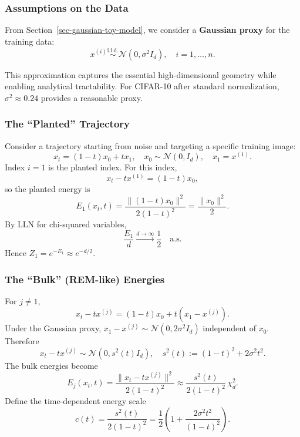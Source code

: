 \documentclass[11pt]{article}
\begin{document}
\subsubsection{Assumptions on the Data}
From Section~\ref{sec-gaussian-toy-model}, we consider a \textbf{Gaussian proxy} for the training data:
\begin{equation}
x^{(i)} \stackrel{\text{i.i.d.}}{\sim} \mathcal{N}(0, \sigma^2 I_d), \quad i = 1, \dots, n.
\end{equation}

This approximation captures the essential high-dimensional geometry while enabling analytical tractability. For CIFAR-10 after standard normalization, $\sigma^2 \approx 0.24$ provides a reasonable proxy.

\subsubsection{The ``Planted'' Trajectory}
Consider a trajectory starting from noise and targeting a specific training image:
\begin{equation}
x_t = (1-t)x_0 + tx_1, \quad x_0 \sim \mathcal{N}(0, I_d), \quad x_1 = x^{(1)}.
\end{equation}
Index $i=1$ is the planted index. For this index,
\begin{equation}
x_t - t x^{(1)} = (1-t) x_0,
\end{equation}
so the planted energy is
\begin{equation}
E_1(x_t,t) = \frac{\|(1-t)x_0\|^2}{2(1-t)^2} = \frac{\|x_0\|^2}{2}.
\end{equation}
By LLN for chi-squared variables,
\begin{equation}
\frac{E_1}{d} \xrightarrow{d\to\infty} \frac{1}{2} \quad \text{a.s.}
\end{equation}
Hence $Z_1=e^{-E_1}\approx e^{-d/2}$.

\subsubsection{The ``Bulk'' (REM-like) Energies}
For $j\neq 1$,
\begin{equation}
x_t - t x^{(j)} = (1-t)x_0 + t(x_1 - x^{(j)}).
\end{equation}
Under the Gaussian proxy, $x_1 - x^{(j)} \sim \mathcal{N}(0, 2\sigma^2 I_d)$ independent of $x_0$. Therefore
\begin{equation}
x_t - t x^{(j)} \sim \mathcal{N}(0, s^2(t) I_d), \quad s^2(t) := (1-t)^2 + 2\sigma^2 t^2.
\end{equation}
The bulk energies become
\begin{equation}
E_j(x_t,t)=\frac{\|x_t - t x^{(j)}\|^2}{2(1-t)^2}
\approx \frac{s^2(t)}{2(1-t)^2}\,\chi_d^2.
\end{equation}
Define the time-dependent energy scale
\begin{equation}
c(t) = \frac{s^2(t)}{2(1-t)^2}
= \frac{1}{2}\left(1 + \frac{2\sigma^2 t^2}{(1-t)^2}\right).
\end{equation}
\end{document}
